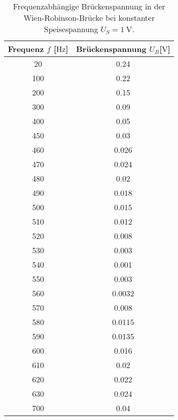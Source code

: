         \begin{table}
            \centering
            \caption{Frequenzabhängige Brückenspannung in der Wien-Robinson-Brücke bei konstanter Speisespannung $U_{S} = \SI{1}{\volt}$.}
            \label{tab:frequencyitis}
            \begin{tabular}{c c}
                \toprule
                Frequenz $f$ \/[$\si{\hertz}$] & Brückenspannung $U_{B}$[$\si{\volt}$]\\
                \midrule
                20    &   0.24 \\
                100   &   0.22 \\             
                200   &   0.15 \\                 
                300   &   0.09 \\             
                400   &   0.05 \\            
                450   &   0.03 \\            
                460   &   0.026 \\            
                470   &   0.024 \\           
                480   &   0.02 \\          
                490   &   0.018 \\           
                500   &   0.015 \\           
                510   &   0.012 \\          
                520   &   0.008 \\         
                530   &   0.003 \\         
                540   &   0.001 \\          
                550   &   0.003 \\         
                560   &   0.0032 \\          
                570   &   0.008 \\          
                580   &   0.0115 \\           
                590   &   0.0135 \\           
                600   &   0.016 \\           
                610   &   0.02 \\         
                620   &   0.022 \\           
                630   &   0.024 \\         
                700   &   0.04 \\         

\end{tabular}
\end{table}
